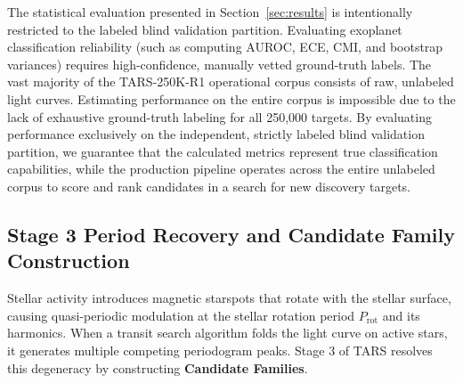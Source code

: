 The statistical evaluation presented in Section~\ref{sec:results} is intentionally restricted to the labeled blind validation partition. Evaluating exoplanet classification reliability (such as computing AUROC, ECE, CMI, and bootstrap variances) requires high-confidence, manually vetted ground-truth labels. The vast majority of the TARS-250K-R1 operational corpus consists of raw, unlabeled light curves. Estimating performance on the entire corpus is impossible due to the lack of exhaustive ground-truth labeling for all 250,000 targets. By evaluating performance exclusively on the independent, strictly labeled blind validation partition, we guarantee that the calculated metrics represent true classification capabilities, while the production pipeline operates across the entire unlabeled corpus to score and rank candidates in a search for new discovery targets.

\subsection{Stage 3 Period Recovery and Candidate Family Construction} \label{sec:method_candidate_family}
Stellar activity introduces magnetic starspots that rotate with the stellar surface, causing quasi-periodic modulation at the stellar rotation period $P_{\text{rot}}$ and its harmonics. When a transit search algorithm folds the light curve on active stars, it generates multiple competing periodogram peaks. Stage 3 of TARS resolves this degeneracy by constructing \textbf{Candidate Families}.


